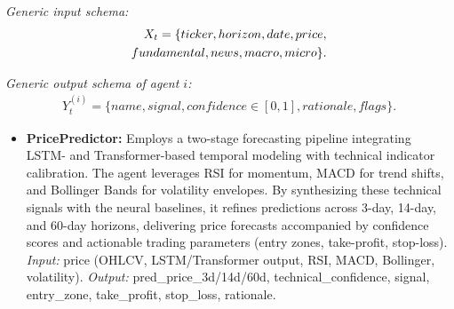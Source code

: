 \documentclass{ieeeaccess}
\begin{document}
\noindent\textit{Generic input schema:}
\begin{align}
X_t=\{ticker, horizon, date, price, \notag\\
fundamental, news, macro, micro\}.
\end{align}

\noindent\textit{Generic output schema of agent $i$:}
\begin{align}
Y_t^{(i)}=\{name, signal, confidence\in[0,1], rationale, flags\}.
\end{align}

\begin{itemize}
    \item \textbf{PricePredictor:} 
    Employs a two-stage forecasting pipeline integrating LSTM- and Transformer-based temporal modeling with technical indicator calibration. The agent leverages RSI for momentum, MACD for trend shifts, and Bollinger Bands for volatility envelopes. By synthesizing these technical signals with the neural baselines, it refines predictions across 3-day, 14-day, and 60-day horizons, delivering price forecasts accompanied by confidence scores and actionable trading parameters (entry zones, take-profit, stop-loss).
    \textit{Input:} price (OHLCV, LSTM/Transformer output, RSI, MACD, Bollinger, volatility).  
    \textit{Output:} pred\_price\_3d/14d/60d, technical\_confidence, signal, entry\_zone, take\_profit, stop\_loss, rationale.


\end{itemize}
\end{document}
